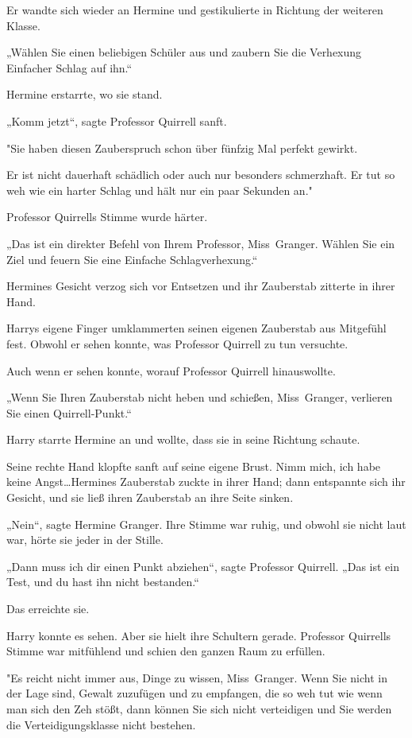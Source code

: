 {Er wandte sich wieder an Hermine und gestikulierte in Richtung der weiteren Klasse.

„Wählen Sie einen beliebigen Schüler aus und zaubern Sie die Verhexung Einfacher Schlag auf ihn.“

Hermine erstarrte, wo sie stand.

„Komm jetzt“, sagte Professor Quirrell sanft.

"Sie haben diesen Zauberspruch schon über fünfzig Mal perfekt gewirkt.

Er ist nicht dauerhaft schädlich oder auch nur besonders schmerzhaft. Er tut so weh wie ein harter Schlag und hält nur ein paar Sekunden an."

Professor Quirrells Stimme wurde härter.

„Das ist ein direkter Befehl von Ihrem Professor, Miss~Granger. Wählen Sie ein Ziel und feuern Sie eine Einfache Schlagverhexung.“

Hermines Gesicht verzog sich vor Entsetzen und ihr Zauberstab zitterte in ihrer Hand.

Harrys eigene Finger umklammerten seinen eigenen Zauberstab aus Mitgefühl fest. Obwohl er sehen konnte, was Professor Quirrell zu tun versuchte.

Auch wenn er sehen konnte, worauf Professor Quirrell hinauswollte.

„Wenn Sie Ihren Zauberstab nicht heben und schießen, Miss~Granger, verlieren Sie einen Quirrell-Punkt.“

Harry starrte Hermine an und wollte, dass sie in seine Richtung schaute.

Seine rechte Hand klopfte sanft auf seine eigene Brust. Nimm mich, ich habe keine Angst…Hermines Zauberstab zuckte in ihrer Hand; dann entspannte sich ihr Gesicht, und sie ließ ihren Zauberstab an ihre Seite sinken.

„Nein“, sagte Hermine Granger. Ihre Stimme war ruhig, und obwohl sie nicht laut war, hörte sie jeder in der Stille.

„Dann muss ich dir einen Punkt abziehen“, sagte Professor Quirrell. „Das ist ein Test, und du hast ihn nicht bestanden.“

Das erreichte sie.

Harry konnte es sehen. Aber sie hielt ihre Schultern gerade. Professor Quirrells Stimme war mitfühlend und schien den ganzen Raum zu erfüllen.

"Es reicht nicht immer aus, Dinge zu wissen, Miss~Granger. Wenn Sie nicht in der Lage sind, Gewalt zuzufügen und zu empfangen, die so weh tut wie wenn man sich den Zeh stößt, dann können Sie sich nicht verteidigen und Sie werden die Verteidigungsklasse nicht bestehen.

}
